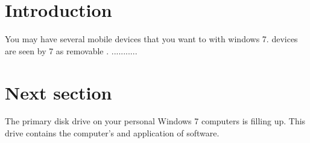 \documentclass{article}
\begin{document}
\tableofcontents
\section{Introduction}
You may have several mobile devices that you want to
 with windows 7. devices are seen
by  7 as removable .
...........
\section{Next section}
The primary  disk drive on your personal Windows 7
computers is filling up. This drive contains the computer’s
 and application of software.

\printindex
\end{document}

